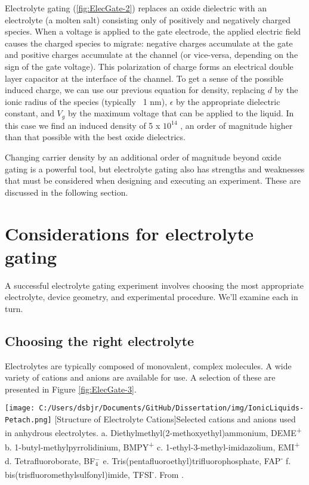 Electrolyte gating (\ref{fig:ElecGate-2}) replaces an oxide dielectric with an electrolyte (a molten salt) consisting only of positively and negatively charged species. When a voltage is applied to the gate electrode, the applied electric field causes the charged species to migrate: negative charges accumulate at the gate and positive charges accumulate at the channel (or vice-versa, depending on the sign of the gate voltage). This polarization of charge forms an electrical double layer capacitor at the interface of the channel. To get a sense of the possible induced charge, we can use our previous equation for density, replacing $d$ by the ionic radius of the species (typically ~1 nm), $\epsilon$ by the appropriate dielectric constant, and $V_{g}$ by the maximum voltage that can be applied to the liquid. In this case we find an induced density of 5 x $10^{14}$ \percmsq , an order of magnitude higher than that possible with the best oxide dielectrics.

Changing carrier density by an additional order of magnitude beyond oxide gating is a powerful tool, but electrolyte gating also has strengths and weaknesses that must be considered when designing and executing an experiment. These are discussed in the following section.

\section{Considerations for electrolyte gating}

A successful electrolyte gating experiment involves choosing the most appropriate electrolyte, device geometry, and experimental procedure. We'll examine each in turn.

\subsection{Choosing the right electrolyte}

Electrolytes are typically composed of monovalent, complex molecules. A wide variety of cations and anions are available for use. A selection of these are presented in Figure \ref{fig:ElecGate-3}.

\begin{centering}
\texttt{[image: C:/Users/dsbjr/Documents/GitHub/Dissertation/img/IonicLiquids-Petach.png]}
  \captionsetup{width=0.75\textwidth}
  [Structure of Electrolyte Cations]{Selected cations and anions used in anhydrous electrolytes. a. Diethylmethyl(2-methoxyethyl)ammonium, DEME\textsuperscript{+} b. 1-butyl-methylpyrrolidinium, BMPY\textsuperscript{+} c. 1-ethyl-3-methyl-imidazolium, EMI\textsuperscript{+} d. Tetrafluoroborate, BF$_{4}^{-}$ e. Tris(pentafluoroethyl)trifluorophosphate, FAP\textsuperscript{-} f. bis(trisfluoromethylsulfonyl)imide, TFSI\textsuperscript{-}. From \cite{Petach2017}.} 
  \label{fig:ElecGate-3}
\end{centering}

